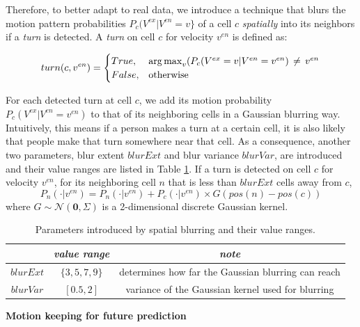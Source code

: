 Therefore, to better adapt to real data, we introduce a technique that blurs the motion pattern probabilities  \( P_c(V^{ex} | V^{en}=v\} \) of a cell $c$ \textit{spatially} into its neighbors if a \textit{turn} is detected. A \textit{turn} on cell $c$ for velocity $v^{en}$ is defined as:

\[ 
turn(c, v^{en}) = 
\begin{cases}
    True , &  \operatorname*{arg\,max}_v (P_c(V^{ex}=v | V^{en}=v^{en}) \, \neq \, v^{en} \\
    False,              & \text{otherwise}
\end{cases}
 \]


For each detected turn at cell $c$, we add its motion probability $P_c(V^{ex} | V^{en}=v^{en})$ to that of its neighboring cells in a Gaussian blurring way. Intuitively, this means if a person makes a turn at a certain cell, it is also likely that people make that turn somewhere near that cell. As a consequence, another two parameters, blur extent \( blurExt \) and blur variance  \( blurVar \), are introduced and their value ranges are listed in Table \ref{table:spatial_blur_param_range}. If a turn is detected on cell $c$ for velocity $v^{en}$, for its neighboring cell $n$ that is less than $blurExt$ cells away from $c$,
\begin{equation}
P_n(\cdot| v^{en}) = P_n(\cdot| v^{en})  + P_c(\cdot| v^{en}) \times G(pos(n)-pos(c))
\end{equation}
where $G \sim \mathcal{N}(\mathbf{0}, \Sigma)$ is a 2-dimensional discrete Gaussian kernel.
\begin{table}[H]
\centering  
\begin{tabularx}{.8\textwidth}{c|c|c}
    \hline
      &  \textit{value range } & \textit{note} \\ \hline
    \( blurExt \) & \( \{3, 5, 7, 9\} \) & \footnotesize{determines how far the Gaussian blurring can reach} \\
     \( blurVar \) & \( [0.5, 2]\) & \footnotesize{ variance of the Gaussian kernel used for blurring} \\   
   \hline
  \end{tabularx}
\caption{Parameters introduced by spatial blurring and their value ranges.}
\label{table:spatial_blur_param_range}
\end{table}

\newpage
\textbf{Motion keeping for future prediction}

